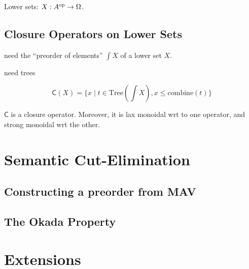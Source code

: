 \documentclass[twoside,11pt]{entics}
\begin{document}
Lower sets: $X : A^{\mathrm{op}} \to \Omega$.



\subsection{Closure Operators on Lower Sets}

need the ``preorder of elements'' $\int X$ of a lower set $X$.

need trees

\begin{displaymath}
  \mathsf{C}(X) = \{ x \mid t \in \mathrm{Tree}(\int X), x \leq \mathrm{combine}(t) \}
\end{displaymath}

\begin{theorem}
  $\mathsf{C}$ is a closure operator. Moreover, it is lax monoidal wrt
  to one operator, and strong monoidal wrt the other.
\end{theorem}



\section{Semantic Cut-Elimination}

\subsection{Constructing a preorder from MAV}

\subsection{The Okada Property}

\section{Extensions}
\label{sec:extensions}




\end{document}
